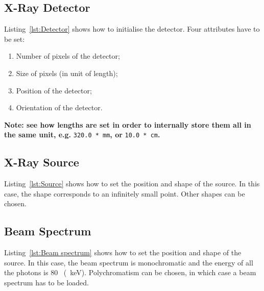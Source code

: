 \documentclass[11pt,oneside,a4paper,final]{article}
\begin{document}
\subsection{X-Ray Detector}



Listing~\ref{lst:Detector} shows how to initialise the detector. 
Four attributes have to be set:
\begin{enumerate}
 \item Number of pixels of the detector;
 \item Size of pixels (in unit of length);
 \item Position of the detector;
 \item Orientation of the detector.
\end{enumerate}

\textbf{Note: see how lengths are set in order to internally store them all in the same unit, e.g.} \verb+320.0 * mm+\textbf{, or} \verb+10.0 * cm+\textbf{.}

\subsection{X-Ray Source}



Listing~\ref{lst:Source} shows how to set the position and shape of the source. 
In this case, the shape corresponds to an infinitely small point. 
Other shapes can be chosen. %


\subsection{Beam Spectrum}



Listing~\ref{lst:Beam spectrum} shows how to set the position and shape of the source. 
In this case, the beam spectrum is monochromatic and the energy of all the photons is 80~ (~\acrshort{keV}). 
Polychromatism can be chosen, in which case a beam spectrum has to be loaded. %
\end{document}
